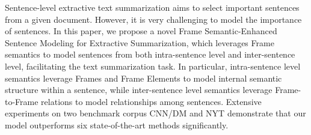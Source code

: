 Sentence-level extractive text summarization aims to select important sentences from a given document. However, it is very challenging to model the importance of sentences. In this paper, we propose a novel Frame Semantic-Enhanced Sentence Modeling for Extractive Summarization, which leverages Frame semantics to model sentences from both intra-sentence level and inter-sentence level, facilitating  the text summarization task. In particular, intra-sentence level semantics leverage Frames and Frame Elements to model internal semantic structure within a sentence, while inter-sentence level semantics leverage Frame-to-Frame relations to model relationships among sentences. Extensive experiments on two benchmark corpus CNN/DM and NYT demonstrate  that our model outperforms six state-of-the-art methods significantly.
